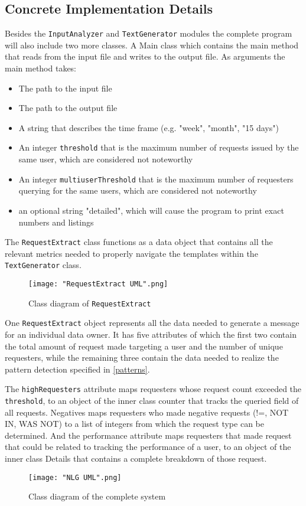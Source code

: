 \documentclass[sigconf,obeyspaces]{acmart}
\begin{document}
\subsection{Concrete Implementation Details}
Besides the \texttt{InputAnalyzer} and \texttt{TextGenerator} modules the complete program will also include two more classes. A Main class which contains the main method that reads from the input file and writes to the output file. As arguments the main method takes:
\begin{itemize}
    \item The path to the input file
    \item The path to the output file
    \item A string that describes the time frame (e.g. "week", "month", "15 days")
    \item An integer \texttt{threshold} that is the maximum number of requests issued by the same user, which are considered not noteworthy
    \item An integer \texttt{multiuserThreshold} that is the maximum number of requesters querying for the same users, which are considered not noteworthy
    \item an optional string "detailed", which will cause the program to print exact numbers and listings
\end{itemize}
The \texttt{RequestExtract} class functions as a data object that contains all the relevant metrics needed to properly navigate the templates within the \texttt{TextGenerator} class.
\begin{figure}[h]
    \centering
    \texttt{[image: "RequestExtract UML".png]}
    \caption{Class diagram of \texttt{RequestExtract}}
    \label{RequestExtract UML}
\end{figure}
One \texttt{RequestExtract} object represents all the data needed to generate a message for an individual data owner. It has five attributes of which the first two contain the total amount of request made targeting a user and the number of unique requesters, while the remaining three contain the data needed to realize the pattern detection specified in \ref{patterns}.

The \texttt{highRequesters} attribute maps requesters whose request count exceeded the \texttt{threshold}, to an object of the inner class counter that tracks the queried field of all requests. Negatives maps requesters who made negative requests (!=, NOT IN, WAS NOT) to a list of integers from which the request type can be determined. And the performance attribute maps requesters that made request that could be related to tracking the performance of a user, to an object of the inner class Details that contains a complete breakdown of those request.
\begin{figure*}
    \hspace*{-1.8cm}
    \texttt{[image: "NLG UML".png]}
    \caption{Class diagram of the complete system}
    \label{Full UML}
\end{figure*}
\end{document}
